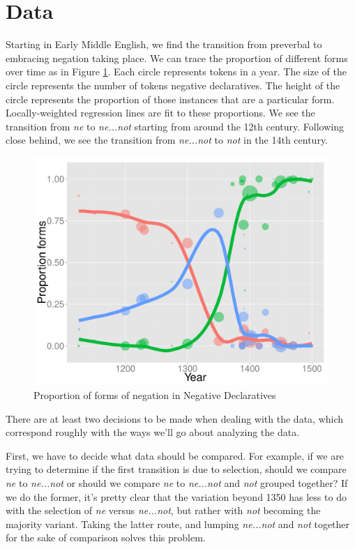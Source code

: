 \section{Data}

Starting in Early Middle English, we find the transition from preverbal to embracing negation taking place. We can trace the proportion of different forms over time as in Figure \ref{neg-three-plot}. Each circle represents tokens in a year. The size of the circle represents the number of tokens negative declaratives. The height of the circle represents the proportion of those instances that are a particular form. Locally-weighted regression lines are fit to these proportions. We see the transition from \textit{\color{red} ne} to \textit{\color{blue} ne...not} starting from around the 12th century. Following close behind, we see the transition from \textit{\color{blue} ne...not} to \textit{\color{green} not} in the 14th century.

\begin{figure}
\centering
     \includegraphics[width=\textwidth]{neg-year-lines.pdf}
\caption{Proportion of forms of negation in Negative Declaratives}
\label{neg-three-plot}
\end{figure}

There are at least two decisions to be made when dealing with the data, which correspond roughly with the ways we'll go about analyzing the data.

First, we have to decide what data should be compared. For example, if we are trying to determine if the first transition is due to selection, should we compare \textit{\color{red} ne} to \textit{\color{blue} ne...not} or should we compare \textit{\color{red} ne} to \textit{\color{blue} ne...not} and \textit{\color{green} not} grouped together? If we do the former, it's pretty clear that the variation beyond 1350 has less to do with the selection of \textit{\color{red} ne} versus \textit{\color{blue} ne...not}, but rather with\textit{\color{green} not} becoming the majority variant. Taking the latter route, and lumping \textit{\color{blue} ne...not} and \textit{\color{green} not} together for the sake of comparison solves this problem.

